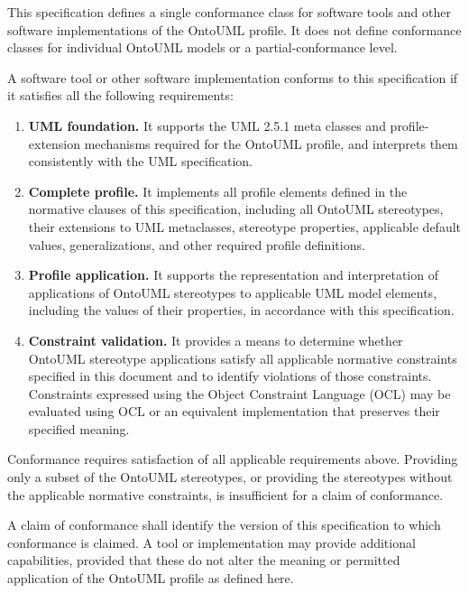 This specification defines a single conformance class for software tools and other software implementations of the OntoUML profile. It does not define conformance classes for individual OntoUML models or a partial-conformance level.

A software tool or other software implementation conforms to this specification if it satisfies all the following requirements:

\begin{enumerate}
  \item \textbf{UML foundation.} It supports the UML 2.5.1 meta classes and profile-extension mechanisms required for the OntoUML profile, and interprets them consistently with the UML specification.

  \item \textbf{Complete profile.} It implements all profile elements defined in the normative clauses of this specification, including all OntoUML stereotypes, their extensions to UML metaclasses, stereotype properties, applicable default values, generalizations, and other required profile definitions.

  \item \textbf{Profile application.} It supports the representation and interpretation of applications of OntoUML stereotypes to applicable UML model elements, including the values of their properties, in accordance with this specification.

  \item \textbf{Constraint validation.} It provides a means to determine whether OntoUML stereotype applications satisfy all applicable normative constraints specified in this document and to identify violations of those constraints. Constraints expressed using the Object Constraint Language (OCL) may be evaluated using OCL or an equivalent implementation that preserves their specified meaning.
\end{enumerate}

Conformance requires satisfaction of all applicable requirements above. Providing only a subset of the OntoUML stereotypes, or providing the stereotypes without the applicable normative constraints, is insufficient for a claim of conformance.

A claim of conformance shall identify the version of this specification to which conformance is claimed. A tool or implementation may provide additional capabilities, provided that these do not alter the meaning or permitted application of the OntoUML profile as defined here.